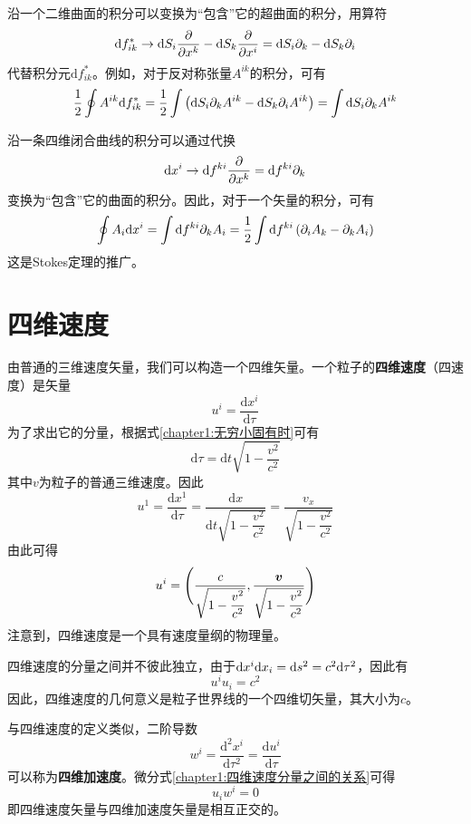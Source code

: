 沿一个二维曲面的积分可以变换为“包含”它的超曲面的积分，用算符
\begin{equation}
	\mathrm{d}f^*_{ik} \to \mathrm{d}S_i \frac{\partial}{\partial x^k} - \mathrm{d}S_k \frac{\partial}{\partial x^i} = \mathrm{d}S_i \partial_k - \mathrm{d}S_k \partial_i
\end{equation}
代替积分元$\mathrm{d}f^*_{ik}$。例如，对于反对称张量$A^{ik}$的积分，可有
\begin{equation}
	\frac12 \oint A^{ik}\mathrm{d}f^*_{ik} = \frac12 \int \left(\mathrm{d}S_i \partial_kA^{ik} - \mathrm{d}S_k \partial_iA^{ik}\right) = \int \mathrm{d}S_i \partial_kA^{ik}
\end{equation}

沿一条四维闭合曲线的积分可以通过代换
\begin{equation}
	\mathrm{d}x^i \to \mathrm{d}f^{ki}\frac{\partial}{\partial x^k} = \mathrm{d}f^{ki} \partial_k
\end{equation}
变换为“包含”它的曲面的积分。因此，对于一个矢量的积分，可有
\begin{equation}
	\oint A_i \mathrm{d}x^i = \int \mathrm{d}f^{ki}\partial_kA_i = \frac12 \int \mathrm{d}f^{ki} \left(\partial_iA_k - \partial_kA_i\right)
\end{equation}
这是Stokes定理的推广。

\section{四维速度}

由普通的三维速度矢量，我们可以构造一个四维矢量。一个粒子的{\bf 四维速度}（四速度）是矢量
\begin{equation}
	u^i = \frac{\mathrm{d} x^i}{\mathrm{d} \tau}
\end{equation}
为了求出它的分量，根据式\eqref{chapter1:无穷小固有时}可有
\begin{equation}
	\mathrm{d}\tau = \mathrm{d}t\sqrt{1-\frac{v^2}{c^2}}
\end{equation}
其中$v$为粒子的普通三维速度。因此
\begin{equation*}
	u^1 = \frac{\mathrm{d}x^1}{\mathrm{d}\tau} = \frac{\mathrm{d}x}{\mathrm{d}t\sqrt{1-\dfrac{v^2}{c^2}}} = \frac{v_x}{\sqrt{1-\dfrac{v^2}{c^2}}}
\end{equation*}
由此可得
\begin{equation}
	u^i = \Bigg(\frac{c}{\sqrt{1-\dfrac{v^2}{c^2}}},\frac{\boldsymbol{v}}{\sqrt{1-\dfrac{v^2}{c^2}}}\Bigg)
\end{equation}
注意到，四维速度是一个具有速度量纲的物理量。

四维速度的分量之间并不彼此独立，由于$\mathrm{d}x^i\mathrm{d}x_i = \mathrm{d}s^2=c^2 \mathrm{d} \tau^2$，因此有
\begin{equation}
	u^iu_i = c^2
	\label{chapter1:四维速度分量之间的关系}
\end{equation}
因此，四维速度的几何意义是粒子世界线的一个四维切矢量，其大小为$c$。

与四维速度的定义类似，二阶导数
\begin{equation*}
	w^i = \frac{\mathrm{d}^2 x^i}{\mathrm{d} \tau^2} = \frac{\mathrm{d} u^i}{\mathrm{d} \tau}
\end{equation*}
可以称为{\bf 四维加速度}。微分式\eqref{chapter1:四维速度分量之间的关系}可得
\begin{equation}
	u_i w^i = 0
\end{equation}
即四维速度矢量与四维加速度矢量是相互正交的。
